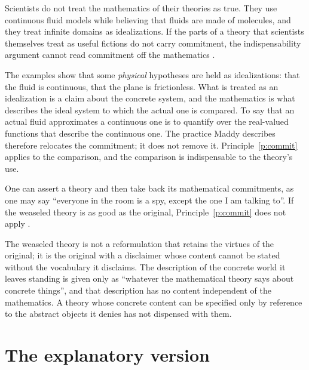 \documentclass{situationist-preprint}
\begin{document}
\begin{objection}
Scientists do not treat the mathematics of their theories as true. They use continuous fluid models while believing that fluids are made of molecules, and they treat infinite domains as idealizations. If the parts of a theory that scientists themselves treat as useful fictions do not carry commitment, the indispensability argument cannot read commitment off the mathematics \citep{Maddy1992}.
\end{objection}

\begin{reply}
The examples show that some \emph{physical} hypotheses are held as idealizations: that the fluid is continuous, that the plane is frictionless. What is treated as an idealization is a claim about the concrete system, and the mathematics is what describes the ideal system to which the actual one is compared. To say that an actual fluid approximates a continuous one is to quantify over the real-valued functions that describe the continuous one. The practice Maddy describes therefore relocates the commitment; it does not remove it. Principle~\ref{p:commit} applies to the comparison, and the comparison is indispensable to the theory's use.
\end{reply}

\begin{objection}
One can assert a theory and then take back its mathematical commitments, as one may say \enquote{everyone in the room is a spy, except the one I am talking to}. If the weaseled theory is as good as the original, Principle~\ref{p:commit} does not apply \citep{Melia2000}.
\end{objection}

\begin{reply}
The weaseled theory is not a reformulation that retains the virtues of the original; it is the original with a disclaimer whose content cannot be stated without the vocabulary it disclaims. The description of the concrete world it leaves standing is given only as \enquote{whatever the mathematical theory says about concrete things}, and that description has no content independent of the mathematics. A theory whose concrete content can be specified only by reference to the abstract objects it denies has not dispensed with them.
\end{reply}

\section{The explanatory version}\label{s:expl}
\end{document}
